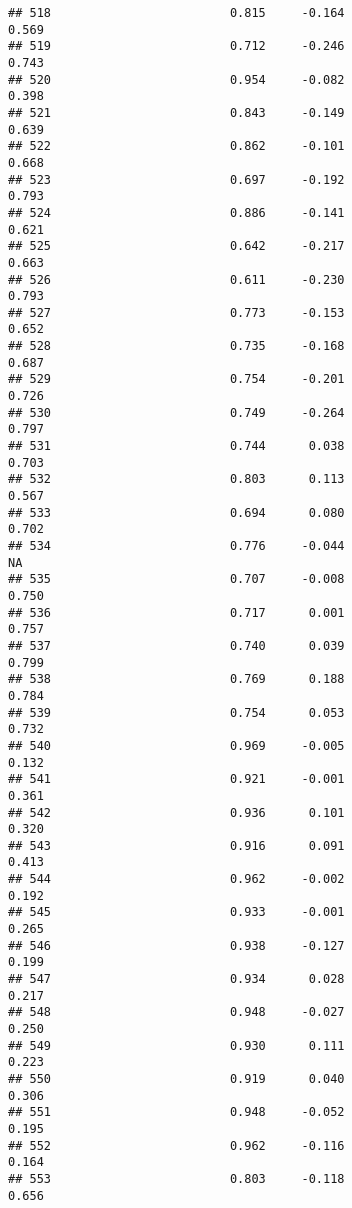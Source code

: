 \documentclass[
]{article}
\begin{document}
\begin{verbatim}
## 518                         0.815     -0.164                     0.569
## 519                         0.712     -0.246                     0.743
## 520                         0.954     -0.082                     0.398
## 521                         0.843     -0.149                     0.639
## 522                         0.862     -0.101                     0.668
## 523                         0.697     -0.192                     0.793
## 524                         0.886     -0.141                     0.621
## 525                         0.642     -0.217                     0.663
## 526                         0.611     -0.230                     0.793
## 527                         0.773     -0.153                     0.652
## 528                         0.735     -0.168                     0.687
## 529                         0.754     -0.201                     0.726
## 530                         0.749     -0.264                     0.797
## 531                         0.744      0.038                     0.703
## 532                         0.803      0.113                     0.567
## 533                         0.694      0.080                     0.702
## 534                         0.776     -0.044                        NA
## 535                         0.707     -0.008                     0.750
## 536                         0.717      0.001                     0.757
## 537                         0.740      0.039                     0.799
## 538                         0.769      0.188                     0.784
## 539                         0.754      0.053                     0.732
## 540                         0.969     -0.005                     0.132
## 541                         0.921     -0.001                     0.361
## 542                         0.936      0.101                     0.320
## 543                         0.916      0.091                     0.413
## 544                         0.962     -0.002                     0.192
## 545                         0.933     -0.001                     0.265
## 546                         0.938     -0.127                     0.199
## 547                         0.934      0.028                     0.217
## 548                         0.948     -0.027                     0.250
## 549                         0.930      0.111                     0.223
## 550                         0.919      0.040                     0.306
## 551                         0.948     -0.052                     0.195
## 552                         0.962     -0.116                     0.164
## 553                         0.803     -0.118                     0.656

\end{verbatim}
\end{document}
